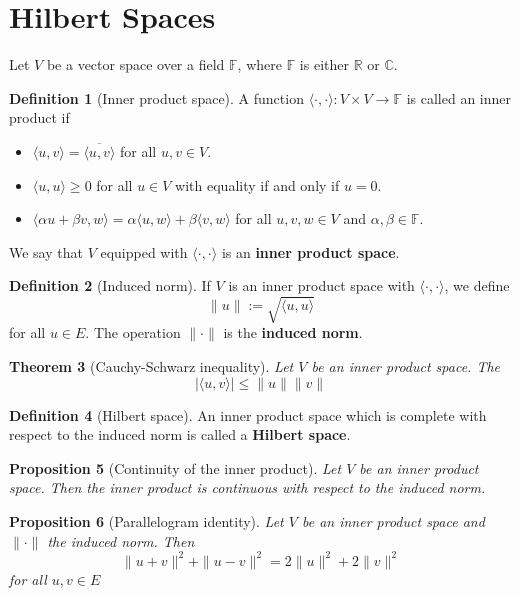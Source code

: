 \documentclass[10pt, oneside, reqno]{amsart}
\theoremstyle{plain}%
\newtheorem{thm}{Theorem}[section]
\newtheorem{prop}[thm]{Proposition}
\theoremstyle{definition}
\newtheorem{defn}[thm]{Definition}
\theoremstyle{remark}
\newcommand{\R}{\mathbb{R}}
\newcommand{\Com}{\mathbb{C}}
\newcommand{\F}{\mathbb{F}}
\newcommand{\iprod}[2]{\langle #1, #2 \rangle}
\newcommand{\ol}[1]{\overline{#1}}
\begin{document}

\section{Hilbert Spaces} %
\label{sec:hilbert_spaces}
Let $V$ be a vector space over a field $\F$, where $\F$ is either $\R$ or $\Com$.

\begin{defn}[Inner product space]
    A function $\langle \cdot, \cdot \rangle: V \times V \rightarrow \F$ is called an inner product if 
    \begin{itemize}
        \item $\iprod{u}{v} = \ol{\iprod{u}{v}}$ for all $u,v \in V$.
        \item $\iprod{u}{u} \geq 0$ for all $u \in V$ with equality if and only if $u = 0$.
        \item $\iprod{\alpha u + \beta v}{w} = \alpha \iprod{u}{w} + \beta \iprod{v}{w}$ for all $u,v,w \in V$ and $\alpha, \beta \in \F$.
    \end{itemize}
    We say that $V$ equipped with $\iprod{\cdot}{\cdot}$ is an \textbf{inner product space}.
\end{defn}

\begin{defn}[Induced norm]
    If $V$ is an inner product space with $\iprod{\cdot}{\cdot}$, we define \[
        \| u \| := \sqrt{\iprod{u}{u}}
    \] for all $u \in E$.  The operation $\| \cdot \|$ is the \textbf{induced norm}.
\end{defn}

\begin{thm}[Cauchy-Schwarz inequality]
    Let $V$ be an inner product space.  The \[
        |\iprod{u}{v}| \leq \|u \| \| v \|
    \]
\end{thm}

\begin{defn}[Hilbert space]
    An inner product space which is complete with respect to the induced norm is called a \textbf{Hilbert space}.
\end{defn}

\begin{prop}[Continuity of the inner product]
    Let $V$ be an inner product space.  Then the inner product is continuous with respect to the induced norm.  
\end{prop}

\begin{prop}[Parallelogram identity]
    Let $V$ be an inner product space and $\| \cdot \|$ the induced norm.  Then \[
        \| u + v \|^2 + \| u - v \|^2 = 2 \|u \|^2 + 2 \| v \|^2
    \] for all $u,v \in E$
\end{prop}
\end{document}
